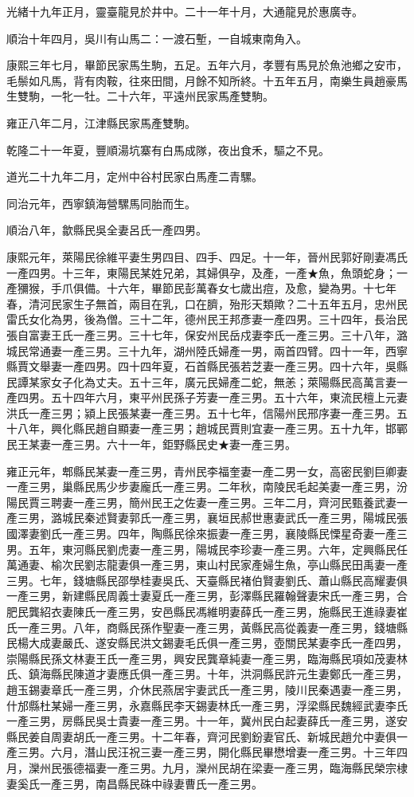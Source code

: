 \begin{pinyinscope}
光緒十九年正月，靈臺龍見於井中。二十一年十月，大通龍見於惠廣寺。

順治十年四月，吳川有山馬二：一渡石塹，一自城東南角入。

康熙三年七月，畢節民家馬生駒，五足。五年六月，孝豐有馬見於魚池鄉之安市，毛鬃如凡馬，背有肉鞍，往來田間，月餘不知所終。十五年五月，南樂生員趙豪馬生雙駒，一牝一牡。二十六年，平遠州民家馬產雙駒。

雍正八年二月，江津縣民家馬產雙駒。

乾隆二十一年夏，豐順湯坑寨有白馬成隊，夜出食禾，驅之不見。

道光二十九年二月，定州中谷村民家白馬產二青騾。

同治元年，西寧鎮海營騾馬同胎而生。

順治八年，歙縣民吳全妻呂氏一產四男。

康熙元年，萊陽民徐維平妻生男四目、四手、四足。十一年，晉州民郭好剛妻馮氏一產四男。十三年，東陽民某姓兄弟，其婦俱孕，及產，一產★魚，魚頭蛇身；一產獼猴，手爪俱備。十六年，畢節民彭萬春女七歲出痘，及愈，變為男。十七年春，清河民家生子無首，兩目在乳，口在臍，殆形天類歟？二十五年五月，忠州民雷氏女化為男，後為僧。三十二年，德州民王邦彥妻一產四男。三十四年，長治民張自富妻王氏一產三男。三十七年，保安州民岳戍妻李氏一產三男。三十八年，潞城民常通妻一產三男。三十九年，湖州陸氏婦產一男，兩首四臂。四十一年，西寧縣賈文舉妻一產四男。四十四年夏，石首縣民張若芝妻一產三男。四十六年，吳縣民譚某家女子化為丈夫。五十三年，廣元民婦產二蛇，無恙；萊陽縣民高萬言妻一產四男。五十四年六月，東平州民孫子芳妻一產三男。五十六年，東流民檀上元妻洪氏一產三男；潁上民張某妻一產三男。五十七年，信陽州民邢序妻一產三男。五十八年，興化縣民趙自顯妻一產三男；趙城民賈則宜妻一產三男。五十九年，邯鄲民王某妻一產三男。六十一年，鉅野縣民史★妻一產三男。

雍正元年，郫縣民某妻一產三男，青州民李福奎妻一產二男一女，高密民劉巨卿妻一產三男，巢縣民馬少步妻龐氏一產三男。二年秋，南陵民毛起美妻一產三男，汾陽民賈三聘妻一產三男，簡州民王之佐妻一產三男。三年二月，齊河民甄養武妻一產三男，潞城民秦述賢妻郭氏一產三男，襄垣民郝世惠妻武氏一產三男，陽城民張國澤妻劉氏一產三男。四年，陶縣民徐來振妻一產三男，襄陵縣民慄星奇妻一產三男。五年，東河縣民劉虎妻一產三男，陽城民李珍妻一產三男。六年，定興縣民任萬通妻、榆次民劉志龍妻俱一產三男，東山村民家產婦生魚，亭山縣民田禹妻一產三男。七年，錢塘縣民邵學桂妻吳氏、天臺縣民褚伯賢妻劉氏、蕭山縣民高耀妻俱一產三男，新建縣民周義士妻夏氏一產三男，彭澤縣民羅翰聲妻宋氏一產三男，合肥民龔紹衣妻陳氏一產三男，安邑縣民馮維明妻薛氏一產三男，施縣民王進祿妻崔氏一產三男。八年，商縣民孫作聖妻一產三男，黃縣民高從義妻一產三男，錢塘縣民楊大成妻嚴氏、遂安縣民洪文錫妻毛氏俱一產三男，壺關民某妻李氏一產四男，崇陽縣民孫文林妻王氏一產三男，興安民龔章純妻一產三男，臨海縣民項如茂妻林氏、鎮海縣民陳道才妻應氏俱一產三男。十年，洪洞縣民許元生妻鄭氏一產三男，趙玉錫妻章氏一產三男，介休民燕居宇妻武氏一產三男，陵川民秦遇妻一產三男，什邡縣杜某婦一產三男，永嘉縣民李天錫妻林氏一產三男，浮梁縣民魏經武妻李氏一產三男，房縣民吳士貴妻一產三男。十一年，冀州民白起妻薛氏一產三男，遂安縣民姜自周妻胡氏一產三男。十二年春，齊河民劉鈖妻官氏、新城民趙允中妻俱一產三男。六月，潛山民汪祝三妻一產三男，開化縣民畢懋增妻一產三男。十三年四月，灤州民張德福妻一產三男。九月，灤州民胡在梁妻一產三男，臨海縣民榮宗棣妻奚氏一產三男，南昌縣民硃中祿妻曹氏一產三男。


\end{pinyinscope}
